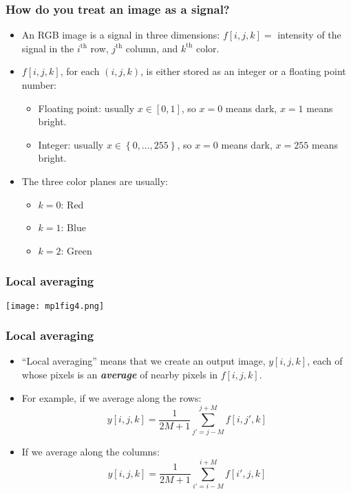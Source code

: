 \documentclass{beamer}
\begin{document}
\begin{frame}
  \frametitle{How do you treat an image as a signal?}
  \begin{itemize}
  \item
    An RGB image is a signal in three dimensions: $f[i,j,k]=$
    intensity of the signal in the $i^{\textrm{th}}$ row,
    $j^{\textrm{th}}$ column, and $k^{\textrm{th}}$ color.
  \item
    $f[i,j,k]$, for each $(i,j,k)$, is either stored as an integer or
    a floating point number:
    \begin{itemize}
    \item Floating point: usually $x\in[0,1]$, so $x=0$ means dark,
      $x=1$ means bright.
    \item Integer: usually $x\in\left\{0,\ldots,255\right\}$, so
      $x=0$ means dark, $x=255$ means bright.
    \end{itemize}
  \item The three color planes are usually:
    \begin{itemize}
    \item $k=0$: Red
    \item $k=1$: Blue
    \item $k=2$: Green
    \end{itemize}
  \end{itemize}
\end{frame}
    
\begin{frame}
  \frametitle{Local averaging}
  \centerline{\texttt{[image: mp1fig4.png]}}
\end{frame}

\begin{frame}
  \frametitle{Local averaging}

  \begin{itemize}
    \item 
      ``Local averaging'' means that we create an output image,
      $y[i,j,k]$, each of whose pixels is an {\bf\em average} of nearby
      pixels in $f[i,j,k]$.
    \item
      For example, if we average along the rows:
      \[
      y[i,j,k] = \frac{1}{2M+1}\sum_{j'=j-M}^{j+M} f[i,j',k]
      \]
    \item
      If we average along the columns:
      \[
      y[i,j,k] = \frac{1}{2M+1}\sum_{i'=i-M}^{i+M} f[i',j,k]
      \]
  \end{itemize}
\end{frame}
\end{document}
